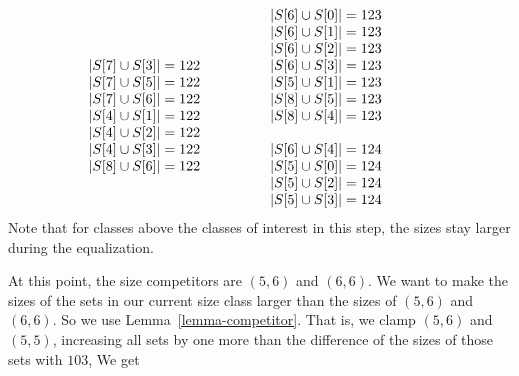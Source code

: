 \documentclass[12pt]{article}
\theoremstyle{definition}
\begin{document}
\[\begin{array}[t]{l@{\qquad\qquad}l@{\qquad\qquad}l}
\begin{array}{l}
  \\
|S[7] \cup S[3]| = 122 \\
|S[7] \cup S[5]| = 122 \\
|S[7] \cup S[6]| = 122 \\
|S[4] \cup S[1]| = 122 \\
|S[4] \cup S[2]| = 122 \\
|S[4] \cup S[3]| = 122 \\
|S[8] \cup S[6]| = 122 \\
 \end{array}
 &
  \begin{array}{l}
|S[6] \cup S[0]| = 123 \\
|S[6] \cup S[1]| = 123 \\
|S[6] \cup S[2]| = 123 \\
|S[6] \cup S[3]| = 123 \\
|S[5] \cup S[1]| = 123 \\
|S[8] \cup S[5]| = 123 \\
|S[8] \cup S[4]| = 123 \\
  \\
|S[6] \cup S[4]| = 124 \\
|S[5] \cup S[0]| = 124 \\
|S[5] \cup S[2]| = 124 \\
|S[5] \cup S[3]| = 124 \\
  \end{array}
    \end{array}
  \]
Note that for classes above the classes of interest in this step,
the sizes stay larger during the equalization.

  \pagebreak
  
At this point, the size competitors are $(5,6)$ and $(6,6)$.
We want to make the sizes of the sets in our current size class larger than the sizes of $(5,6)$ and $(6,6)$.
So we use Lemma~\ref{lemma-competitor}.
That is, we clamp $(5,6)$ and $(5,5)$, increasing all sets by
one more than the difference of the sizes of those sets with $103$, 
We get
\end{document}
